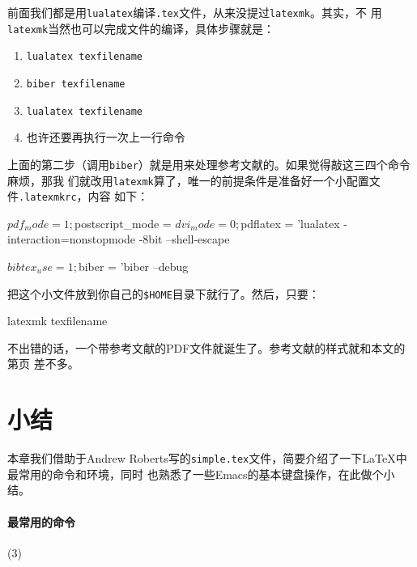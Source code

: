 前面我们都是用\texttt{lualatex}编译\texttt{.tex}文件，从来没提过\texttt{latexmk}。其实，不
用\texttt{latexmk}当然也可以完成文件的编译，具体步骤就是：
\vspace{-3ex}
\begin{singlespace}
  \begin{enumerate}
  \item \texttt{lualatex texfilename}
  \item \texttt{biber texfilename}
  \item \texttt{lualatex texfilename}
  \item 也许还要再执行一次上一行命令
  \end{enumerate}
\end{singlespace}
上面的第二步（调用\texttt{biber}）就是用来处理参考文献的。如果觉得敲这三四个命令麻烦，那我
们就改用\texttt{latexmk}算了，唯一的前提条件是准备好一个小配置文件\texttt{.latexmkrc}，内容
如下：
\begin{codeblock}[.9]
\begin{shcode}
$pdf_mode = 1; $postscript_mode = $dvi_mode = 0;
$pdflatex = 'lualatex -interaction=nonstopmode -8bit --shell-escape %

$bibtex_use = 1;
$biber = 'biber --debug %
\end{shcode}
\end{codeblock}

把这个小文件放到你自己的\verb|$HOME|目录下就行了。然后，只要：

\begin{codeblock}[.9]
  \begin{shcode}
    latexmk texfilename
  \end{shcode}
\end{codeblock}
不出错的话，一个带参考文献的PDF文件就诞生了。参考文献的样式就和本文的第\pageref{p:ref}页
差不多。

\section{小结}

本章我们借助于Andrew Roberts写的\texttt{simple.tex}文件，简要介绍了一下\LaTeX{}中最常用的命令和环境，同时
也熟悉了一些Emacs的基本键盘操作，在此做个小结。

\paragraph{最常用的命令}

\begin{tasks}(3)
\task[] \ltx{\title{}}
\task[] \ltx{\author{}}
\task[] \ltx{\date{}}
\task[] \ltx{\section{}}
\task[] \ltx{\subsection{}}
\task[] \ltx{\subsubsection{}}
\end{tasks}

